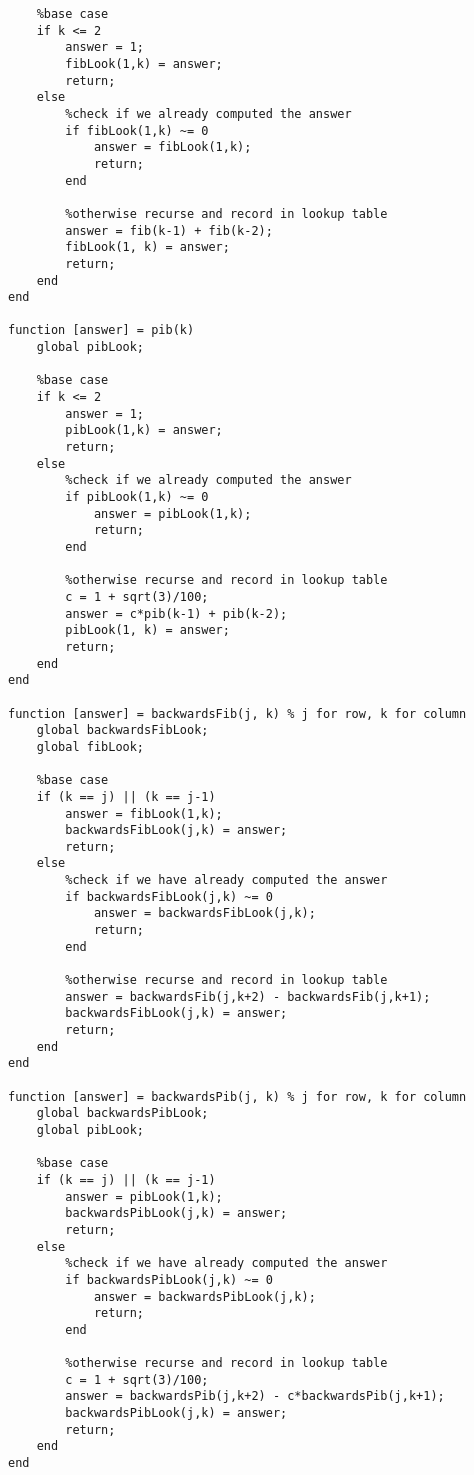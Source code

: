 \documentclass{article}
\begin{document}
\begin{lstlisting}
    %base case
    if k <= 2
        answer = 1;
        fibLook(1,k) = answer;
        return;
    else
        %check if we already computed the answer
        if fibLook(1,k) ~= 0
            answer = fibLook(1,k);
            return;
        end
        
        %otherwise recurse and record in lookup table
        answer = fib(k-1) + fib(k-2);
        fibLook(1, k) = answer;
        return;
    end
end

function [answer] = pib(k)
    global pibLook;
    
    %base case
    if k <= 2
        answer = 1;
        pibLook(1,k) = answer;
        return;
    else
        %check if we already computed the answer
        if pibLook(1,k) ~= 0
            answer = pibLook(1,k);
            return;
        end
        
        %otherwise recurse and record in lookup table
        c = 1 + sqrt(3)/100;
        answer = c*pib(k-1) + pib(k-2);
        pibLook(1, k) = answer;
        return;
    end
end

function [answer] = backwardsFib(j, k) % j for row, k for column
    global backwardsFibLook;
    global fibLook;
    
    %base case
    if (k == j) || (k == j-1)
        answer = fibLook(1,k);
        backwardsFibLook(j,k) = answer;
        return;
    else
        %check if we have already computed the answer
        if backwardsFibLook(j,k) ~= 0
            answer = backwardsFibLook(j,k);
            return;
        end
        
        %otherwise recurse and record in lookup table
        answer = backwardsFib(j,k+2) - backwardsFib(j,k+1);
        backwardsFibLook(j,k) = answer;
        return;
    end
end

function [answer] = backwardsPib(j, k) % j for row, k for column
    global backwardsPibLook;
    global pibLook;
    
    %base case
    if (k == j) || (k == j-1)
        answer = pibLook(1,k);
        backwardsPibLook(j,k) = answer;
        return;
    else
        %check if we have already computed the answer
        if backwardsPibLook(j,k) ~= 0
            answer = backwardsPibLook(j,k);
            return;
        end
        
        %otherwise recurse and record in lookup table
        c = 1 + sqrt(3)/100;
        answer = backwardsPib(j,k+2) - c*backwardsPib(j,k+1);
        backwardsPibLook(j,k) = answer;
        return;
    end
end


\end{lstlisting}
\end{document}
